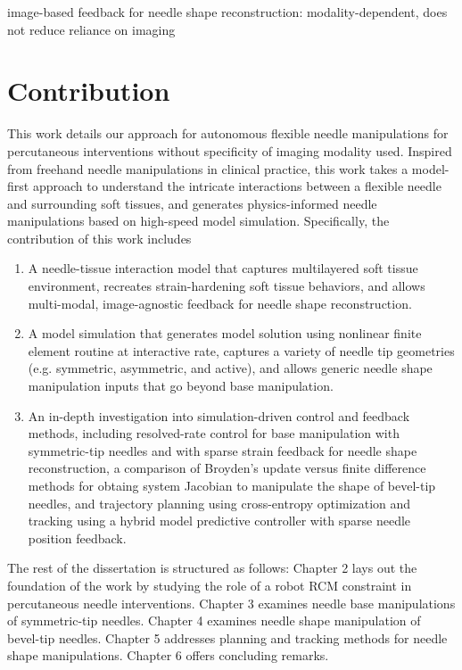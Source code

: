 \alert{image-based feedback for needle shape reconstruction: modality-dependent, does not reduce reliance on imaging}

\section{Contribution}
\label{sec:contribution}

This work details our approach for autonomous flexible needle manipulations for percutaneous interventions without specificity of imaging modality used. Inspired from freehand needle manipulations in clinical practice, this work takes a model-first approach to understand the intricate interactions between a flexible needle and surrounding soft tissues, and generates physics-informed needle manipulations based on high-speed model simulation. Specifically, the contribution of this work includes
\begin{enumerate}[label*=\arabic*.]
\item A needle-tissue interaction model that captures multilayered soft tissue environment, recreates strain-hardening soft tissue behaviors, and allows multi-modal, image-agnostic feedback for needle shape reconstruction.
\item A model simulation that generates model solution using nonlinear finite element routine at interactive rate, captures a variety of needle tip geometries (e.g. symmetric, asymmetric, and active), and allows generic needle shape manipulation inputs that go beyond base manipulation.
\item An in-depth investigation into simulation-driven control and feedback methods, including resolved-rate control for base manipulation with symmetric-tip needles and with sparse strain feedback for needle shape reconstruction, a comparison of Broyden's update versus finite difference methods for obtaing system Jacobian to manipulate the shape of bevel-tip needles, and trajectory planning using cross-entropy optimization and tracking using a hybrid model predictive controller with sparse needle position feedback.
\end{enumerate}

 The rest of the dissertation is structured as follows: Chapter 2 lays out the foundation of the work by studying the role of a robot RCM constraint in percutaneous needle interventions. Chapter 3 examines needle base manipulations of symmetric-tip needles. Chapter 4 examines needle shape manipulation of bevel-tip needles. Chapter 5 addresses planning and tracking methods for needle shape manipulations. Chapter 6 offers concluding remarks.

